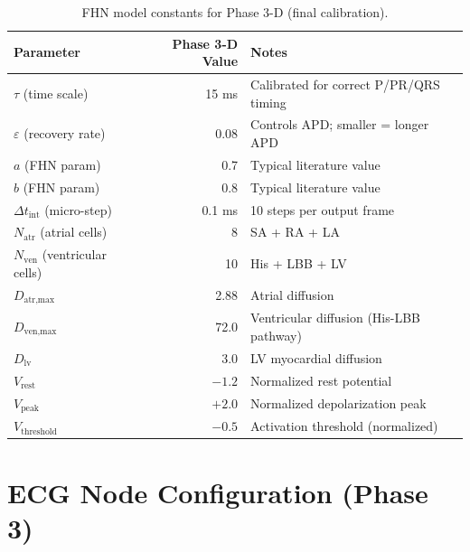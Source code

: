 \documentclass[12pt,a4paper,oneside]{book}
\begin{document}
\begin{table}[H]
    \centering
    \begin{tabular}{|l|r|p{4cm}|}
    \hline
    \textbf{Parameter} & \textbf{Phase 3-D Value} & \textbf{Notes} \\
    \hline
    $\tau$ (time scale) & 15 ms & Calibrated for correct P/PR/QRS timing \\
    $\varepsilon$ (recovery rate) & 0.08 & Controls APD; smaller = longer APD \\
    $a$ (FHN param) & 0.7 & Typical literature value \\
    $b$ (FHN param) & 0.8 & Typical literature value \\
    $\Delta t_{\text{int}}$ (micro-step) & 0.1 ms & 10 steps per output frame \\
    $N_{\text{atr}}$ (atrial cells) & 8 & SA + RA + LA \\
    $N_{\text{ven}}$ (ventricular cells) & 10 & His + LBB + LV \\
    $D_{\text{atr,max}}$ & 2.88 & Atrial diffusion \\
    $D_{\text{ven,max}}$ & 72.0 & Ventricular diffusion (His-LBB pathway) \\
    $D_{\text{lv}}$ & 3.0 & LV myocardial diffusion \\
    $V_{\text{rest}}$ & $-1.2$ & Normalized rest potential \\
    $V_{\text{peak}}$ & $+2.0$ & Normalized depolarization peak \\
    $V_{\text{threshold}}$ & $-0.5$ & Activation threshold (normalized) \\
    \hline
    \end{tabular}
    \caption{FHN model constants for Phase 3-D (final calibration).}
    \label{tab:fhn_constants}
\end{table}

\section{ECG Node Configuration (Phase 3)}
\end{document}
